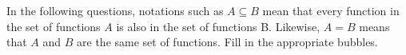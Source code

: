 In the following questions, notations such as $A \subseteq B$ mean that every
function in the set of functions $A$ is also in the set of functions B. Likewise, $A = B$ means
that $A$ and $B$ are the same set of functions. Fill in the appropriate bubbles.
